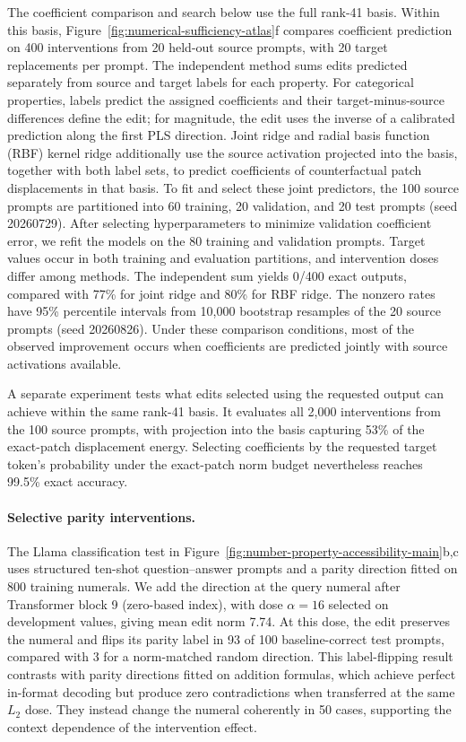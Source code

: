 \documentclass[11pt]{article}
\begin{document}
The coefficient comparison and search below use the full rank-41 basis.
Within this basis, Figure~\ref{fig:numerical-sufficiency-atlas}f compares coefficient prediction on 400 interventions from 20 held-out source prompts, with 20 target replacements per prompt.
The independent method sums edits predicted separately from source and target labels for each property.
For categorical properties, labels predict the assigned coefficients and their target-minus-source differences define the edit; for magnitude, the edit uses the inverse of a calibrated prediction along the first PLS direction.
Joint ridge and radial basis function (RBF) kernel ridge additionally use the source activation projected into the basis, together with both label sets, to predict coefficients of counterfactual patch displacements in that basis.
To fit and select these joint predictors, the 100 source prompts are partitioned into 60 training, 20 validation, and 20 test prompts (seed 20260729).
After selecting hyperparameters to minimize validation coefficient error, we refit the models on the 80 training and validation prompts.
Target values occur in both training and evaluation partitions, and intervention doses differ among methods.
The independent sum yields 0/400 exact outputs, compared with 77\% for joint ridge and 80\% for RBF ridge.
The nonzero rates have 95\% percentile intervals from 10,000 bootstrap resamples of the 20 source prompts (seed 20260826).
Under these comparison conditions, most of the observed improvement occurs when coefficients are predicted jointly with source activations available.

A separate experiment tests what edits selected using the requested output can achieve within the same rank-41 basis.
It evaluates all 2,000 interventions from the 100 source prompts, with projection into the basis capturing 53\% of the exact-patch displacement energy.
Selecting coefficients by the requested target token's probability under the exact-patch norm budget nevertheless reaches 99.5\% exact accuracy.

\paragraph{Selective parity interventions.}
\label{sec:property-reasoning}

The Llama classification test in Figure~\ref{fig:number-property-accessibility-main}b,c uses structured ten-shot question--answer prompts and a parity direction fitted on 800 training numerals.
We add the direction at the query numeral after Transformer block 9 (zero-based index), with dose $\alpha=16$ selected on development values, giving mean edit norm 7.74.
At this dose, the edit preserves the numeral and flips its parity label in 93 of 100 baseline-correct test prompts, compared with 3 for a norm-matched random direction.
This label-flipping result contrasts with parity directions fitted on addition formulas, which achieve perfect in-format decoding but produce zero contradictions when transferred at the same $L_2$ dose.
They instead change the numeral coherently in 50 cases, supporting the context dependence of the intervention effect.
\end{document}
